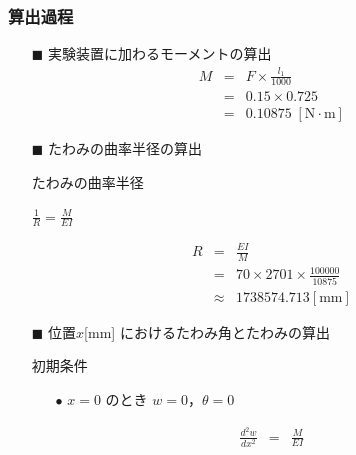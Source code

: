 \documentclass[twocolumn,a4j]{jsarticle}
\begin{document}
    \subsubsection{算出過程}
    \begin{itemize}
        \item [$\blacksquare$] 実験装置に加わるモーメントの算出
        \begin{eqnarray*}
            M &=& F × \frac{l_1}{1000}\\
            &=& 0.15 × 0.725\\
            &=& 0.10875 \;\left[\mathrm{N \cdot m}\right]
        \end{eqnarray*}
        \item [$\blacksquare$] たわみの曲率半径の算出
        \begin{itembox}[l]{たわみの曲率半径}
            \begin{center}
                $\displaystyle \frac{1}{R} = \frac{M}{EI}$
            \end{center}
        \end{itembox}
        \begin{eqnarray*}
            R &=& \frac{EI}{M}\\
            &=& 70 × 2701 × \frac{100000}{10875}\\
            &\approx& 1738574.713 \left[\mathrm{mm}\right]
        \end{eqnarray*}
        \item [$\blacksquare$] 位置$x$[mm] におけるたわみ角とたわみの算出
        \begin{itembox}[l]{初期条件}
        \begin{itemize}
            \item [$\bullet$] $x=0$ のとき $w=0$，$\theta =0$
        \end{itemize}
        \end{itembox}
        \begin{eqnarray*}
            \frac{d^2w}{dx^2}&=&\frac{M}{EI}\\

\end{eqnarray*}
\end{itemize}
\end{document}
